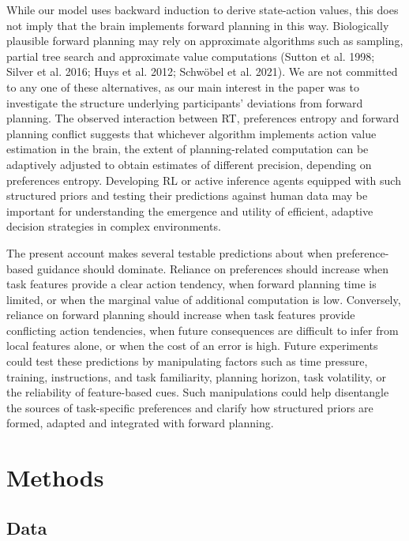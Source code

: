 \documentclass[
  letterpaper,
  DIV=11,
  numbers=noendperiod]{scrartcl}
\begin{document}
While our model uses backward induction to derive state-action values,
this does not imply that the brain implements forward planning in this
way. Biologically plausible forward planning may rely on approximate
algorithms such as sampling, partial tree search and approximate value
computations ({Sutton et al.} 1998; {Silver et al.} 2016; Huys et al.
2012; Schwöbel et al. 2021). We are not committed to any one of these
alternatives, as our main interest in the paper was to investigate the
structure underlying participants' deviations from forward planning. The
observed interaction between RT, preferences entropy and forward
planning conflict suggests that whichever algorithm implements action
value estimation in the brain, the extent of planning-related
computation can be adaptively adjusted to obtain estimates of different
precision, depending on preferences entropy. Developing RL or active
inference agents equipped with such structured priors and testing their
predictions against human data may be important for understanding the
emergence and utility of efficient, adaptive decision strategies in
complex environments.

The present account makes several testable predictions about when
preference-based guidance should dominate. Reliance on preferences
should increase when task features provide a clear action tendency, when
forward planning time is limited, or when the marginal value of
additional computation is low. Conversely, reliance on forward planning
should increase when task features provide conflicting action
tendencies, when future consequences are difficult to infer from local
features alone, or when the cost of an error is high. Future experiments
could test these predictions by manipulating factors such as time
pressure, training, instructions, and task familiarity, planning
horizon, task volatility, or the reliability of feature-based cues. Such
manipulations could help disentangle the sources of task-specific
preferences and clarify how structured priors are formed, adapted and
integrated with forward planning.

\section{Methods}\label{methods}

\subsection{Data}\label{sec-data-desgin}
\end{document}
